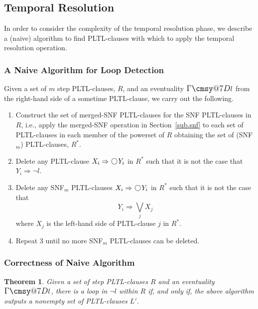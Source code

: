 \documentclass[nohyperref]{acmtrans2f}
\makeatletter
\def\sometime{\mathord{\hbox{\large$\mathchar"0\cmsy@7D$}}}
\newcommand{\next}{\!\raisebox{-.2ex}{ %
                        \mbox{\unitlength=0.9ex
                        \begin{picture}(2,2)
                        \linethickness{0.06ex}
                        \put(1,1){\circle{2}} %
                        \end{picture}}}       %
                        \,}
\let\imp=\Rightarrow
\newtheorem{subtheorem}{Theorem}[subsection]
\makeatother
\begin{document}
\subsection{Temporal Resolution}
%
In order to consider the complexity of the temporal resolution phase, 
we describe a (naive) algorithm to find PLTL-clauses with which to apply the
temporal resolution operation.

\subsubsection{A Naive Algorithm for Loop Detection}
%
Given a set of $m$ step PLTL-clauses, $R$, and an eventuality $\sometime l$
 from the right-hand side of a sometime PLTL-clause, we carry out the
following.
\begin{enumerate}
\item Construct the set of merged-SNF PLTL-clauses for the SNF PLTL-clauses in
$R$, i.e., apply 
the merged-SNF operation in Section~\ref{sub.snf} to
each set of PLTL-clauses in each member of the powerset of $R$ obtaining the
set of (SNF$_m$) PLTL-clauses, $R^*$.
\item Delete any PLTL-clause $X_i \imp \next Y_i$ in $R^*$ such that it is
not the case that $Y_i \imp \neg l$.
\item Delete any SNF$_m$ PLTL-clauses $X_i \imp \next Y_i$ in $R^*$ such that it
is not the case that 
$$Y_i \imp \bigvee_j X_j$$
where $X_j$ is the left-hand side of PLTL-clause $j$ in $R^*$.
\item Repeat 3 until no more SNF$_m$ PLTL-clauses can be deleted.
\end{enumerate}

\subsubsection{Correctness of Naive Algorithm}
%
\begin{subtheorem}
Given a set of step PLTL-clauses $R$ and an eventuality $\sometime l$, there
is a loop in $\neg l$ within $R$ if, and only if, the above algorithm
outputs a nonempty set of PLTL-clauses $L'$.
\end{subtheorem}
\end{document}
